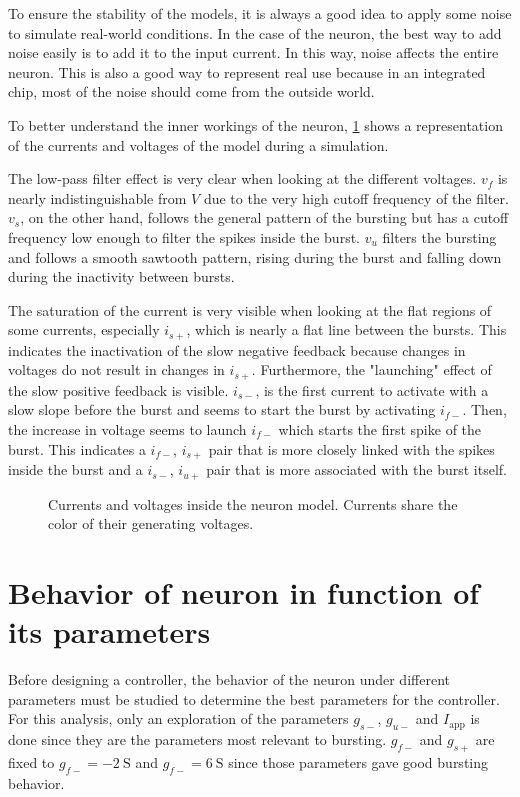 To ensure the stability of the models, it is always a good idea to apply some noise to simulate real-world conditions.
In the case of the neuron, the best way to add noise easily is to add it to the input current.
In this way, noise affects the entire neuron. This is also a good way to represent real use because in an integrated chip, most of the noise should come from the outside world. 

To better understand the inner workings of the neuron, \cref{fig:neuron_inside} shows a representation of the currents and voltages of the model during a simulation. 

The low-pass filter effect is very clear when looking at the different voltages.
$v_f$ is nearly indistinguishable from $V$ due to the very high cutoff frequency of the filter.
$v_s$, on the other hand, follows the general pattern of the bursting but has a cutoff frequency low enough to filter the spikes inside the burst.
$v_u$ filters the bursting and follows a smooth sawtooth pattern, rising during the burst and falling down during the inactivity between bursts.

The saturation of the current is very visible when looking at the flat regions of some currents, especially $i_{s+}$, which is nearly a flat line between the bursts.
This indicates the inactivation of the slow negative feedback because changes in voltages do not result in changes in $i_{s+}$.
Furthermore, the "launching" effect of the slow positive feedback is visible.
$i_{s-}$, is the first current to activate with a slow slope before the burst and seems to start the burst by activating $i_{f-}$.
Then, the increase in voltage seems to launch $i_{f-}$ which starts the first spike of the burst. 
This indicates a $i_{f-}$, $i_{s+}$ pair that is more closely linked with the spikes inside the burst and a $i_{s-}$, $i_{u+}$ pair that is more associated with the burst itself.

\begin{figure}[!htb]
    \centering
    \caption{Currents and voltages inside the neuron model. Currents share the color of their generating voltages.}
    \label{fig:neuron_inside}
\end{figure}

\section{Behavior of neuron in function of its parameters}

Before designing a controller, the behavior of the neuron under different parameters must be studied to determine the best parameters for the controller.
For this analysis, only an exploration of the parameters $g_{s-}$, $g_{u-}$ and $I_\text{app}$ is done since they are the parameters most relevant to bursting.
$g_{f-}$ and $g_{s+}$ are fixed to $g_{f-} = \qty{-2}{\siemens}$ and $g_{f-} = \qty{6}{\siemens}$ since those parameters gave good bursting behavior.


